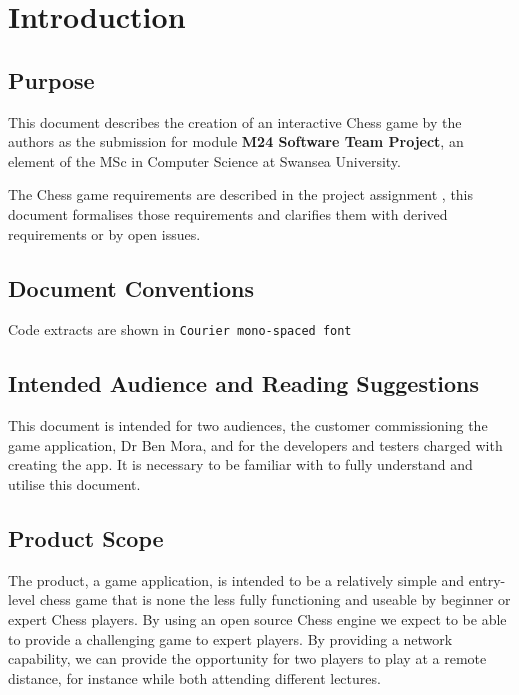 \documentclass[a4paper,10pt]{article}
\begin{document}
\setlength{\parindent}{0cm}

\section{Introduction}
\subsection{Purpose}

This document describes the creation of an interactive Chess game by the authors as the submission for module \textbf{M24 Software Team Project}, an element of the MSc in Computer Science at Swansea University.

The Chess game requirements are described in the project assignment \cite{Assignment2Spec}, this document formalises those requirements and clarifies them with derived requirements or by open issues. 

\subsection{Document Conventions}

Code extracts are shown in \texttt{Courier mono-spaced font}


\subsection{Intended Audience and Reading Suggestions}

This document is intended for two audiences, the customer commissioning the game application, Dr Ben Mora, and for the developers and testers charged with creating the app. It is necessary to be familiar with \cite{Assignment2Spec} to fully understand and utilise this document. 

\subsection{Product Scope}

The product, a game application, is intended to be a relatively simple and entry-level chess game that is none the less fully functioning and useable by beginner or expert Chess players. By using an open source Chess engine we expect to be able to provide a challenging game to expert players. By providing a network capability, we can provide the opportunity for two players to play at a remote distance, for instance while both attending different lectures. 
\end{document}
